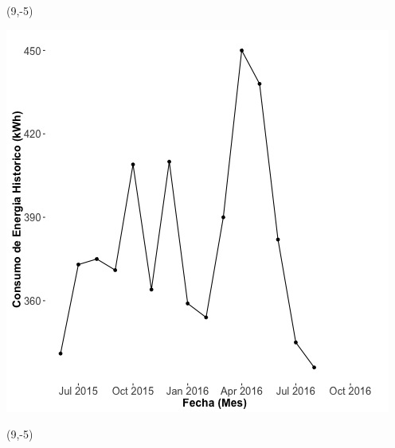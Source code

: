 \documentclass{article}\usepackage[]{graphicx}\usepackage[]{color}
\newenvironment{knitrout}{}{} %
\begin{document}
 \begin{textblock}{1}(9,-5)
\begin{minipage}{20em}
\begingroup

\endgroup
\end{minipage}
\end{textblock}

\begin{knitrout}
\color{fgcolor}
\includegraphics[scale=0.65]{figure/A21_historico_energia} 
\end{knitrout}

 \begin{textblock}{1}(9,-5)
\begin{minipage}{20em}
\begingroup

\endgroup
\end{minipage}
\end{textblock}
\end{document}
